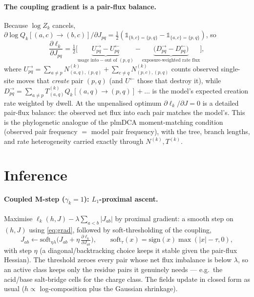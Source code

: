 \documentclass[11pt]{article}
\newcommand{\soft}{\mathrm{soft}}
\begin{document}
\paragraph{The coupling gradient is a pair-flux balance.} Because $\log Z_k$ cancels,
$\partial\log Q_k[(a,c)\!\to\!(b,c)]/\partial J_{pq}=\tfrac12(\mathbb 1_{\{b,c\}=\{p,q\}}
-\mathbb 1_{\{a,c\}=\{p,q\}})$, so
\begin{equation}
\label{eq:grad}
\frac{\partial\ell_k}{\partial J_{pq}}
=\tfrac12\Big[\underbrace{U^{\to}_{pq}-U^{\leftarrow}_{pq}}_{\text{usage into}-\text{out of }(p,q)}
-\underbrace{\big(D^{\to}_{pq}-D^{\leftarrow}_{pq}\big)}_{\text{exposure-weighted rate flux}}\Big],
\end{equation}
where $U^{\to}_{pq}=\sum_{a\ne p}N^{(k)}_{(a,q),(p,q)}+\sum_{c\ne q}N^{(k)}_{(p,c),(p,q)}$
counts observed single-site moves that \emph{create} pair $(p,q)$ (and $U^{\leftarrow}$
those that destroy it), while $D^{\to}_{pq}=\sum_{a\ne p}T^{(k)}_{(a,q)}Q_k[(a,q)\!\to\!(p,q)]
+\dots$ is the model's expected creation rate weighted by dwell. At the unpenalised
optimum $\partial\ell_k/\partial J=0$ is a detailed pair-flux balance: the observed net
flux into each pair matches the model's. This is the phylogenetic analogue of the
plmDCA moment-matching condition (observed pair frequency $=$ model pair frequency), with
the tree, branch lengths, and rate heterogeneity carried exactly through
$N^{(k)},T^{(k)}$.

\section{Inference}
\label{sec:inference}

\paragraph{Coupled M-step ($\gamma_k{=}1$): $L_1$-proximal ascent.} Maximise
$\ell_k(h,J)-\lambda\sum_{a<b}|J_{ab}|$ by proximal gradient: a smooth step on
$(h,J)$ using \eqref{eq:grad}, followed by soft-thresholding of the coupling,
\begin{equation}
\label{eq:soft}
J_{ab}\leftarrow\soft_{\eta\lambda}\!\Big(J_{ab}+\eta\,\tfrac{\partial\ell_k}{\partial J_{ab}}\Big),
\qquad \soft_{\tau}(x)=\mathrm{sign}(x)\max(|x|-\tau,0),
\end{equation}
with step $\eta$ (a diagonal/backtracking choice keeps it stable given the pair-flux
Hessian). The threshold zeroes every pair whose net flux imbalance is below $\lambda$, so
an active class keeps only the residue pairs it genuinely needs --- e.g.\ the acid/base
salt-bridge cells for the charge class. The fields update in closed form as usual
($h\!\propto$ log-composition plus the Gaussian shrinkage).
\end{document}
